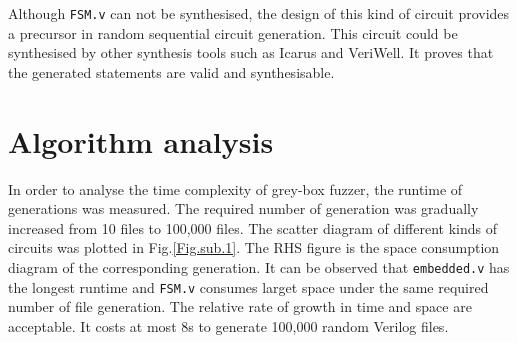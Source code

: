 Although \texttt{FSM.v} can not be synthesised, the design of this kind of circuit provides a precursor in random sequential circuit generation. This circuit could be synthesised by other synthesis tools such as Icarus and VeriWell. It proves that the generated statements are valid and synthesisable.

\section{Algorithm analysis}
In order to analyse the time complexity of grey-box fuzzer, the runtime of generations was measured. The required number of generation was gradually increased from 10 files to 100,000 files. The scatter diagram of different kinds of circuits was plotted in Fig.\ref{Fig.sub.1}. The RHS figure is the space consumption diagram of the corresponding generation. It can be observed that \texttt{embedded.v} has the longest runtime and \texttt{FSM.v} consumes larget space under the same required number of file generation. The relative rate of growth in time and space are acceptable. It costs at most 8s to generate 100,000 random Verilog files.


